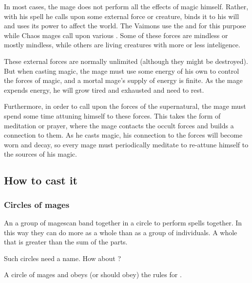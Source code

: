 In most cases, the mage does not perform all the effects of magic himself. 
Rather, with his spell he calls upon some external force or creature, binds it to his will and uses its power to affect the world. 
The Vaimons use the \Sephiroth{} and \Kliffoth{} for this purpose while Chaos mages call upon various . 
Some of these forces are mindless or mostly mindless, while others are living creatures with more or less inteligence.

These external forces are normally unlimited (although they might be destroyed). 
But when casting magic, the mage must use some energy of his own to control the forces of magic, and a mortal mage's supply of energy is finite. 
As the mage expends energy, he will grow tired and exhausted and need to rest. 

Furthermore, in order to call upon the forces of the supernatural, the mage must spend some time attuning himself to these forces. 
This takes the form of meditation or prayer, where the mage contacts the occult forces and builds a connection to them. 
As he casts magic, his connection to the forces will become worn and decay, so every mage must periodically meditate to re-attune himself to the sources of his magic. 









\subsection{How to cast it}





\subsubsection{Circles of mages}
An \dash a group of mages\dash can band together in a circle to perform spells together. In this way they can do more as a whole than as a group of individuals. A whole that is greater than the sum of the parts. 

Such circles need a name. How about ?

A circle of mages  and obeys (or should obey) the rules for \nexuses. 





